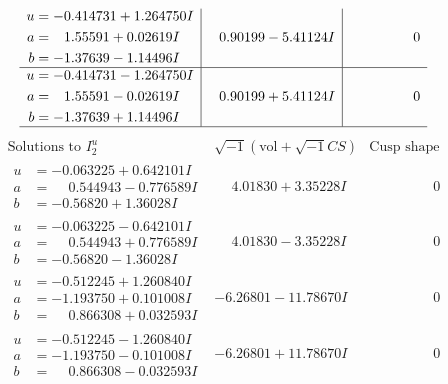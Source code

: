 \documentclass[1p]{elsarticle_modified}
\theoremstyle{definition}
\newcommand{\I}{\sqrt{-1}}
\begin{document}
$$\begin{array}{c|c|c}
\begin{aligned}
u &= -0.414731 + 1.264750 I \\
a &= \phantom{-}1.55591 + 0.02619 I \\
b &= -1.37639 - 1.14496 I\end{aligned}
 & \phantom{-}0.90199 - 5.41124 I & \phantom{-0.000000 } 0 \\ \hline\begin{aligned}
u &= -0.414731 - 1.264750 I \\
a &= \phantom{-}1.55591 - 0.02619 I \\
b &= -1.37639 + 1.14496 I\end{aligned}
 & \phantom{-}0.90199 + 5.41124 I & \phantom{-0.000000 } 0\\
 \hline 
 \end{array}$$\newpage$$\begin{array}{c|c|c}  
\text{Solutions to }I^u_{2}& \I (\text{vol} + \sqrt{-1}CS) & \text{Cusp shape}\\
 \hline 
\begin{aligned}
u &= -0.063225 + 0.642101 I \\
a &= \phantom{-}0.544943 - 0.776589 I \\
b &= -0.56820 + 1.36028 I\end{aligned}
 & \phantom{-}4.01830 + 3.35228 I & \phantom{-0.000000 } 0 \\ \hline\begin{aligned}
u &= -0.063225 - 0.642101 I \\
a &= \phantom{-}0.544943 + 0.776589 I \\
b &= -0.56820 - 1.36028 I\end{aligned}
 & \phantom{-}4.01830 - 3.35228 I & \phantom{-0.000000 } 0 \\ \hline\begin{aligned}
u &= -0.512245 + 1.260840 I \\
a &= -1.193750 + 0.101008 I \\
b &= \phantom{-}0.866308 + 0.032593 I\end{aligned}
 & -6.26801 - 11.78670 I & \phantom{-0.000000 } 0 \\ \hline\begin{aligned}
u &= -0.512245 - 1.260840 I \\
a &= -1.193750 - 0.101008 I \\
b &= \phantom{-}0.866308 - 0.032593 I\end{aligned}
 & -6.26801 + 11.78670 I & \phantom{-0.000000 } 0 \\ \hline\begin{aligned}

\end{aligned}
\end{array}$$
\end{document}
